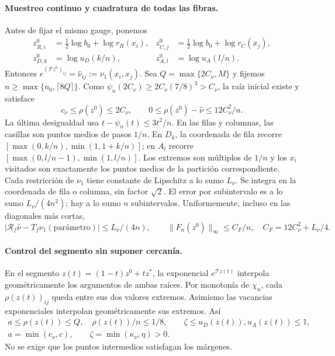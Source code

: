 \paragraph{Muestreo continuo y cuadratura de todas las fibras.}
Antes de fijar el mismo gauge, ponemos
\[
 \begin{aligned}
 z^0_{R,i}&=\tfrac12\log b_0+\log r_R(x_i), & z^0_{C,j}&=\tfrac12\log b_0+\log r_C(x_j),\\
 z^0_{D,k}&=\log u_D(k/n), & z^0_{A,l}&=\log u_A(l/n).
 \end{aligned}                                          \tag{TR6}
\]
Entonces $e^{(\mathcal Tz^0)_{ij}}=\widehat\nu_{ij}:=\nu_1(x_i,x_j)$.
Sea $Q=\max\{2C_\nu,M\}$ y fijemos $n\ge\max\{n_0,\lceil8Q\rceil\}$.
Como $\psi_n(2C_\nu)\ge2C_\nu(7/8)^3>C_\nu$,
la raíz inicial existe y satisface
\[
 c_\nu\le\rho(z^0)\le2C_\nu,\qquad
 0\le\rho(z^0)-\widehat\nu\le12C_\nu^2/n.
                                                        \tag{TR7}
\]
La última desigualdad usa $t-\psi_n(t)\le3t^2/n$.
En las filas y columnas, las casillas son puntos medios de pasos $1/n$.
En $D_k$, la coordenada de fila recorre
$[\max(0,k/n),\min(1,1+k/n)]$; en $A_l$ recorre
$[\max(0,l/n-1),\min(1,l/n)]$.
Los extremos son múltiplos de $1/n$ y los $x_i$ visitados son
exactamente los puntos medios de la partición correspondiente.
Cada restricción de $\nu_1$ tiene constante de Lipschitz a lo sumo $L_\nu$.
Se integra en la coordenada de fila o columna, sin factor $\sqrt2$.
El error por subintervalo es a lo sumo $L_\nu/(4n^2)$; hay a lo sumo
$n$ subintervalos. Uniformemente, incluso en las diagonales más cortas,
\[
 |\mathcal R_f\widehat\nu-T_f\nu_1(\text{parámetro})|
 \le L_\nu/(4n),\qquad
 \|F_n(z^0)\|_\infty\le C_F/n,\quad C_F=12C_\nu^2+L_\nu/4.
                                                        \tag{TR8}
\]

\paragraph{Control del segmento sin suponer cercanía.}
En el segmento $z(t)=(1-t)z^0+tz^*$, la exponencial $e^{\mathcal Tz(t)}$ interpola geométricamente
los argumentos de ambas raíces. Por monotonía de $\chi_n$, cada
$\rho(z(t))_{ij}$ queda entre sus dos valores extremos. Asimismo las
vacancias exponenciales interpolan geométricamente sus extremos. Así
\[
 \begin{gathered}
 a\le\rho(z(t))\le Q,\quad \rho(z(t))/n\le1/8,\qquad
 \zeta\le u_D(z(t)),u_A(z(t))\le1,\\
 a=\min(c_\nu,c),\qquad\zeta=\min(\kappa_\nu,\eta)>0.
 \end{gathered}                                         \tag{TR9}
\]
No se exige que los puntos intermedios satisfagan los márgenes.
